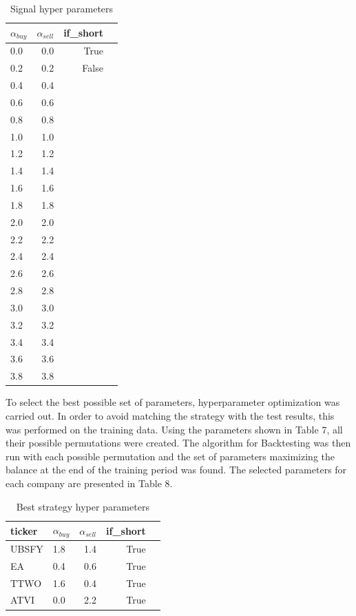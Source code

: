 \documentclass[review]{elsarticle} %
\begin{document}
\begin{table}[H]
\centering
\caption{Signal hyper parameters}
\begin{tabular}{lrrl}
\toprule
  $\alpha_{buy}$ &  $\alpha_{sell}$  & if\_short \\
\midrule
        0.0 &           0.0 &     True \\
         0.2 &           0.2 &    False \\
         0.4 &           0.4  \\
         0.6 &           0.6  \\
          0.8 &           0.8  \\
          1.0 &           1.0  \\
          1.2 &           1.2  \\
          1.4 &           1.4  \\
          1.6 &           1.6  \\
          1.8 &           1.8  \\
         2.0 &           2.0  \\
          2.2 &           2.2  \\
          2.4 &           2.4  \\
          2.6 &           2.6  \\
          2.8 &           2.8  \\
          3.0 &           3.0  \\
          3.2 &           3.2  \\
          3.4 &           3.4  \\
          3.6 &           3.6  \\
          3.8 &           3.8  \\
\bottomrule
\end{tabular}
\end{table}

To select the best possible set of parameters, hyperparameter optimization was carried out. In order to avoid matching the strategy with the test results, this was performed on the training data. Using the parameters shown in Table 7, all their possible permutations were created. The algorithm for Backtesting was then run with each possible permutation and the set of parameters maximizing the balance at the end of the training period was found. The selected parameters for each company are presented in Table 8. 

\begin{table}[H]
\centering
\caption{Best strategy hyper parameters}
\begin{tabular}{llrrl}
\toprule
 ticker &  $\alpha_{buy}$ &  $\alpha_{sell}$  &  if\_short \\
\midrule
  UBSFY &          1.8 &           1.4 &      True \\
     EA &          0.4 &           0.6 &      True \\
   TTWO &          1.6 &           0.4 &      True \\
   ATVI &          0.0 &           2.2 &      True \\
\bottomrule
\end{tabular}
\end{table}
\end{document}
